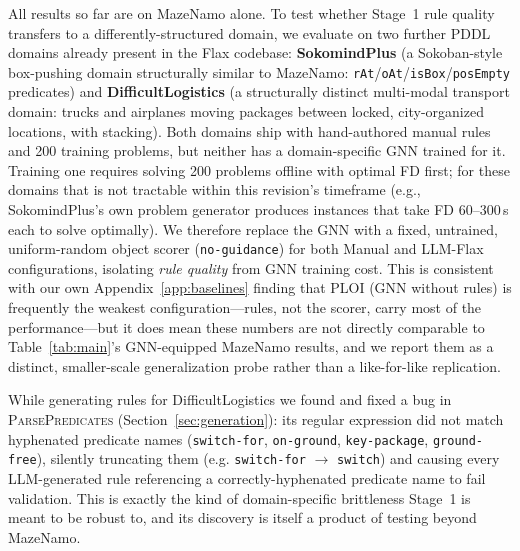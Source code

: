 \documentclass[letterpaper, 10pt, journal, twoside]{IEEEtran}
\newcommand{\sref}[1]{Section~\ref{#1}}
\newcommand{\tref}[1]{Table~\ref{#1}}
\newcommand{\method}{LLM-Flax\xspace}
\begin{document}
All results so far are on MazeNamo alone. To test whether Stage~1 rule quality transfers to a differently-structured domain, we evaluate on two further PDDL domains already present in the Flax codebase: \textbf{SokomindPlus} (a Sokoban-style box-pushing domain structurally similar to MazeNamo: \texttt{rAt}/\texttt{oAt}/\texttt{isBox}/\texttt{posEmpty} predicates) and \textbf{DifficultLogistics} (a structurally distinct multi-modal transport domain: trucks and airplanes moving packages between locked, city-organized locations, with stacking).
Both domains ship with hand-authored manual rules and 200 training problems, but neither has a domain-specific GNN trained for it.
Training one requires solving 200 problems offline with optimal FD first; for these domains that is not tractable within this revision's timeframe (e.g., SokomindPlus's own problem generator produces instances that take FD 60--300\,s each to solve optimally).
We therefore replace the GNN with a fixed, untrained, uniform-random object scorer (\texttt{no-guidance}) for both Manual and \method configurations, isolating \emph{rule quality} from GNN training cost.
This is consistent with our own Appendix~\ref{app:baselines} finding that PLOI (GNN without rules) is frequently the weakest configuration---rules, not the scorer, carry most of the performance---but it does mean these numbers are not directly comparable to \tref{tab:main}'s GNN-equipped MazeNamo results, and we report them as a distinct, smaller-scale generalization probe rather than a like-for-like replication.

While generating rules for DifficultLogistics we found and fixed a bug in \textsc{ParsePredicates} (\sref{sec:generation}): its regular expression did not match hyphenated predicate names (\texttt{switch-for}, \texttt{on-ground}, \texttt{key-package}, \texttt{ground-free}), silently truncating them (e.g. \texttt{switch-for} $\to$ \texttt{switch}) and causing every LLM-generated rule referencing a correctly-hyphenated predicate name to fail validation. This is exactly the kind of domain-specific brittleness Stage~1 is meant to be robust to, and its discovery is itself a product of testing beyond MazeNamo.
\end{document}
